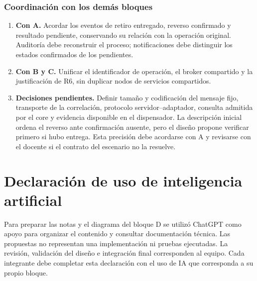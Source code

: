 \documentclass[12pt,a4paper]{article}
\begin{document}
\subsubsection{Coordinación con los demás bloques}

\begin{enumerate}
    \item \textbf{Con A.} Acordar los eventos de retiro entregado, reverso confirmado y resultado pendiente, conservando su relación con la operación original. Auditoría debe reconstruir el proceso; notificaciones debe distinguir los estados confirmados de los pendientes.
    \item \textbf{Con B y C.} Unificar el identificador de operación, el broker compartido y la justificación de R6, sin duplicar nodos de servicios compartidos.
    \item \textbf{Decisiones pendientes.} Definir tamaño y codificación del mensaje fijo, transporte de la correlación, protocolo servidor--adaptador, consulta admitida por el core y evidencia disponible en el dispensador. La descripción inicial ordena el reverso ante confirmación ausente, pero el diseño propone verificar primero si hubo entrega. Esta precisión debe acordarse con A y revisarse con el docente si el contrato del escenario no la resuelve.
\end{enumerate}

\section*{Declaración de uso de inteligencia artificial}

Para preparar las notas y el diagrama del bloque D se utilizó ChatGPT como apoyo para organizar el contenido y consultar documentación técnica. Las propuestas no representan una implementación ni pruebas ejecutadas. La revisión, validación del diseño e integración final corresponden al equipo. Cada integrante debe completar esta declaración con el uso de IA que corresponda a su propio bloque.
\end{document}
